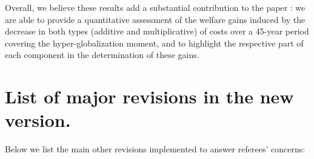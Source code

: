 \documentclass[12pt]{article}
\begin{document}
Overall, we believe these results add a substantial contribution to the paper : we are able to provide a quantitative assessment of the welfare gains induced by the decrease in both types (additive and multiplicative) of costs over a 45-year period covering the hyper-globalization moment, and to highlight the respective part of each component in the determination of these gains. %


\section{List of major revisions in the new version.}

Below we list the main other revisions implemented to answer referees' concerns:
\end{document}
